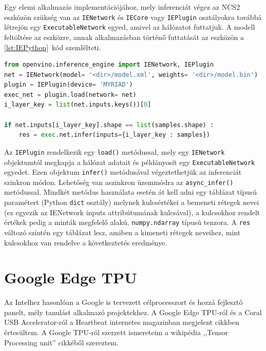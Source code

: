 Egy elemi alkalmazás implementációjához, mely inferenciát végez az NCS2 eszközön szükség van az \verb|IENetwork| és \verb|IECore| vagy \verb|IEPlugin| osztályokra továbbá létrejön egy \verb|ExecutableNetwork| egyed, amivel az hálózatot futtatjuk. %
A modell feltöltése az eszközre, annak alkalmazásban történő futtatását az eszközön a \ref{lst:IEPython}~kód szemlélteti.
\begin{minipage}{\textwidth}
	\begin{lstlisting}[language=Python,caption=Inference Engine használata PYthon-ból ]
from openvino.inference_engine import IENetwork, IEPlugin
net = IENetwork(model= '<dir>/model.xml', weights= '<dir>/model.bin')
plugin = IEPlugin(device= 'MYRIAD')
exec_net = plugin.load(network= net)
i_layer_key = list(net.inputs.keys())[0]

if net.inputs[i_layer_key].shape == list(samples.shape) :
	res = exec.net.infer(inputs={i_layer_key : samples})
	\end{lstlisting}\label{lst:IEPython}
\end{minipage}
Az \verb|IEPlugin| rendelkezik egy \verb|load()| metódussal, mely egy \verb|IENetwork| objektumtól megkapja a hálózat adatait és példányosít egy \verb|ExecutableNetwork| egyedet. Ezen objektum \verb|infer()| metódusával végeztethetjük az inferenciát szinkron módon. Lehetőség van aszinkron üzemmódra az \verb|async_infer()| metódussal. Mindkét metódus használata esetén át kell adni egy táblázat típusú paramétert (Python \verb|dict| osztály) melynek kulcsértékei a bemeneti rétegek nevei (ez egyezik az IENetwork inputs attribútumának kulcsával), a kulcsokhoz rendelt értékek pedig a minták megfelelő alakú, \verb|numpy.ndarray| típusú tenzora. A \verb|res| változó szintén egy táblázat lesz, amiben a kimeneti rétegek neveihez, mint kulcsokhoz van rendelve a következtetés eredménye. 


\section{Google Edge TPU}
Az Intelhez hasonlóan a Google is tervezett célprocesszort és hozzá fejlesztő panelt, mély tanulást alkalmazó projektekhez. A Google Edge TPU-ról és a Coral USB Accelerator-ról a Heartbeat internetes magazinban megjelent cikkben értesültem.\cite{web:GoogleEdge} A Google TPU-ról szerzett ismereteim a wikipédia ,,Tensor Processing unit'' cikkéből szereztem.\cite{wiki:TPU}

